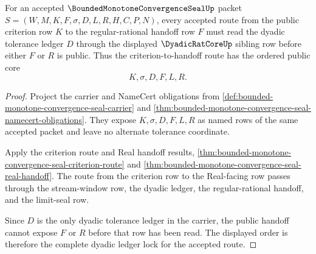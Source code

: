 \begin{theorem}
\label{thm:bounded-monotone-convergence-seal-criterion-dyadic-ledger-lock}
For an accepted $\BoundedMonotoneConvergenceSealUp$ packet $S=(W,M,K,F,\sigma,D,L,R,H,C,P,N)$, every accepted route from the public criterion row $K$ to the regular-rational handoff row $F$ must read the dyadic tolerance ledger $D$ through the displayed $\DyadicRatCoreUp$ sibling row before either $F$ or $R$ is public. Thus the criterion-to-handoff route has the ordered public core
$$
K,\sigma,D,F,L,R.
$$
\end{theorem}
\begin{proof}
Project the carrier and NameCert obligations from \autoref{def:bounded-monotone-convergence-seal-carrier} and \autoref{thm:bounded-monotone-convergence-seal-namecert-obligations}. They expose $K,\sigma,D,F,L,R$ as named rows of the same accepted packet and leave no alternate tolerance coordinate.

Apply the criterion route and Real handoff results, \autoref{thm:bounded-monotone-convergence-seal-criterion-route} and \autoref{thm:bounded-monotone-convergence-seal-real-handoff}. The route from the criterion row to the Real-facing row passes through the stream-window row, the dyadic ledger, the regular-rational handoff, and the limit-seal row.

Since $D$ is the only dyadic tolerance ledger in the carrier, the public handoff cannot expose $F$ or $R$ before that row has been read. The displayed order is therefore the complete dyadic ledger lock for the accepted route.
\end{proof}


